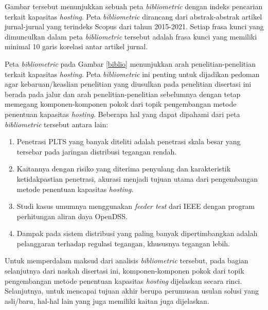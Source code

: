 Gambar tersebut menunjukkan sebuah peta \textit{bibliometric} dengan indeks pencarian terkait kapasitas \textit{hosting}. Peta \textit{bibliometric} dirancang dari abstrak-abstrak artikel jurnal-jurnal yang terindeks Scopus dari tahun 2015-2021. Setiap frasa kunci yang dimunculkan dalam peta \textit{bibliometric} tersebut adalah frasa kunci yang memiliki minimal 10 garis korelasi antar artikel jurnal.

Peta \textit{bibliometric} pada Gambar \ref{biblio} menunjukkan arah penelitian-penelitian terkait kapasitas \textit{hosting}. Peta \textit{bibliometric} ini penting untuk dijadikan pedoman agar kebaruan/keaslian penelitian yang diusulkan pada penelitian disertasi ini berada pada jalur dan arah penelitian-penelitian sebelumnya dengan tetap memegang komponen-komponen pokok dari topik pengembangan metode penentuan kapasitas \textit{hosting}.  Beberapa hal yang dapat dipahami dari peta \textit{bibliometric} tersebut antara lain:
\begin{enumerate}
	\item Penetrasi PLTS yang banyak diteliti adalah penetrasi skala besar yang tersebar pada jaringan distribusi tegangan rendah. 
	\item Kaitannya dengan risiko yang diterima penyulang dan karakteristik ketidakpastian penetrasi, akurasi menjadi tujuan utama dari pengembangan metode penentuan kapasitas \textit{hosting}.
	\item Studi kasus umumnya menggunakan \textit{feeder test} dari IEEE dengan program perhitungan aliran daya OpenDSS.
	\item Dampak pada sistem distribusi yang paling banyak dipertimbangkan adalah pelanggaran terhadap regulasi tegangan, khususnya tegangan lebih.
\end{enumerate}

Untuk memperdalam maksud dari analisis \textit{bibliometric} tersebut, pada bagian selanjutnya dari naskah disertasi ini, komponen-komponen pokok dari topik pengembangan metode penentuan kapasitas \textit{hosting} dijelaskan secara rinci. Selanjutnya, untuk mencapai tujuan akhir berupa perumusan usulan solusi yang asli/baru, hal-hal lain yang juga memiliki kaitan juga dijelaskan.

